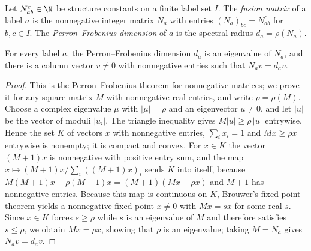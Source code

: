 \begin{definition}%
    \label{def:mposym_pf_dimension}
    \leanok
    Let $N_{ab}^c\in\N$ be structure constants on a finite label set $I$. The
    \emph{fusion matrix} of a label $a$ is the nonnegative integer matrix
    $N_a$ with entries $(N_a)_{bc}=N_{ab}^c$ for $b,c\in I$. The
    \emph{Perron--Frobenius dimension} of $a$ is the spectral radius
    $d_a=\rho(N_a)$.
\end{definition}

\begin{lemma}%
    \label{thm:mposym_pf_eigenvector}
    \leanok
    For every label $a$, the Perron--Frobenius dimension $d_a$ is an
    eigenvalue of $N_a$, and there is a column vector $v\neq0$ with
    nonnegative entries such that $N_av=d_av$.
\end{lemma}

\begin{proof}
    \leanok
    This is the Perron--Frobenius theorem for nonnegative matrices; we prove
    it for any square matrix $M$ with nonnegative real entries, and write
    $\rho=\rho(M)$. Choose a complex eigenvalue $\mu$ with $|\mu|=\rho$ and
    an eigenvector $u\neq0$, and let $|u|$ be the vector of moduli
    $|u_i|$. The triangle inequality gives $M|u|\geq\rho\,|u|$ entrywise.
    Hence the set $K$ of vectors $x$ with nonnegative entries,
    $\sum_ix_i=1$ and $Mx\geq\rho x$ entrywise is nonempty; it is compact
    and convex. For $x\in K$ the vector $(M+1)x$ is nonnegative with
    positive entry sum, and the map
    $x\mapsto(M+1)x/\sum_i((M+1)x)_i$ sends $K$ into itself, because
    $M(M+1)x-\rho(M+1)x=(M+1)(Mx-\rho x)$ and $M+1$ has nonnegative
    entries. Because this map is continuous on $K$, Brouwer's fixed-point
    theorem yields a nonnegative fixed point $x\neq0$ with $Mx=sx$ for some
    real $s$. Since $x\in K$ forces $s\geq\rho$ while $s$ is an eigenvalue
    of $M$ and therefore satisfies $s\leq\rho$, we obtain $Mx=\rho x$,
    showing that $\rho$ is an eigenvalue; taking $M=N_a$ gives $N_av=d_av$.
\end{proof}


